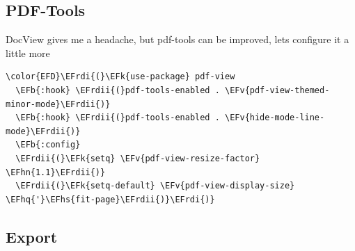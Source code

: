 \documentclass{scrartcl}
\newcommand{\EFk}[1]{\textcolor{EFk}{#1}} %
\newcommand{\EFb}[1]{\textcolor{EFb}{#1}} %
\newcommand{\EFv}[1]{\textcolor{EFv}{#1}} %
\newcommand{\EFhn}[1]{#1} %
\newcommand{\EFhq}[1]{#1} %
\newcommand{\EFhs}[1]{#1} %
\newcommand{\EFrdi}[1]{#1} %
\newcommand{\EFrdii}[1]{#1} %
\begin{document}
\subsection{PDF-Tools}
\label{sec:org6bc68df}
DocView gives me a headache, but pdf-tools can be improved, lets configure it a little more
\begin{Code}
\begin{Verbatim}[]
\color{EFD}\EFrdi{(}\EFk{use-package} pdf-view
  \EFb{:hook} \EFrdii{(}pdf-tools-enabled . \EFv{pdf-view-themed-minor-mode}\EFrdii{)}
  \EFb{:hook} \EFrdii{(}pdf-tools-enabled . \EFv{hide-mode-line-mode}\EFrdii{)}
  \EFb{:config}
  \EFrdii{(}\EFk{setq} \EFv{pdf-view-resize-factor} \EFhn{1.1}\EFrdii{)}
  \EFrdii{(}\EFk{setq-default} \EFv{pdf-view-display-size} \EFhq{'}\EFhs{fit-page}\EFrdii{)}\EFrdi{)}
\end{Verbatim}
\end{Code}

\subsection{Export}
\label{sec:orga7aeded}
\end{document}
